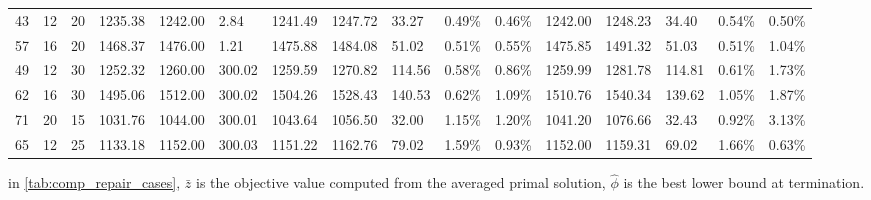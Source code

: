 \documentclass[../main]{subfiles}
\begin{document}
\begin{longtable}{l|ll|lll|lllll|lllll}
   43 & 12                         & 20                         & 1235.38                   & 1242.00     & 2.84                & 1241.49 & 1247.72 & 33.27  & 0.49\%  & 0.46\% & 1242.00 & 1248.23 & 34.40  & 0.54\%  & 0.50\% \\
   57 & 16                         & 20                         & 1468.37                   & 1476.00     & 1.21                & 1475.88 & 1484.08 & 51.02  & 0.51\%  & 0.55\% & 1475.85 & 1491.32 & 51.03  & 0.51\%  & 1.04\% \\
   49 & 12                         & 30                         & 1252.32                   & 1260.00     & 300.02              & 1259.59 & 1270.82 & 114.56 & 0.58\%  & 0.86\% & 1259.99 & 1281.78 & 114.81 & 0.61\%  & 1.73\% \\
   62 & 16                         & 30                         & 1495.06                   & 1512.00     & 300.02              & 1504.26 & 1528.43 & 140.53 & 0.62\%  & 1.09\% & 1510.76 & 1540.34 & 139.62 & 1.05\%  & 1.87\% \\
   71 & 20                         & 15                         & 1031.76                   & 1044.00     & 300.01              & 1043.64 & 1056.50 & 32.00  & 1.15\%  & 1.20\% & 1041.20 & 1076.66 & 32.43  & 0.92\%  & 3.13\% \\
   65 & 12                         & 25                         & 1133.18                   & 1152.00     & 300.03              & 1151.22 & 1162.76 & 79.02  & 1.59\%  & 0.93\% & 1152.00 & 1159.31 & 69.02  & 1.66\%  & 0.63\% \\
   \bottomrule
\end{longtable}

\small
in \ref{tab:comp_repair_cases}, $\bar z$ is the objective value computed from
the averaged primal solution,
$\hat \phi$ is the best lower bound at termination.

\normalsize
\end{document}
